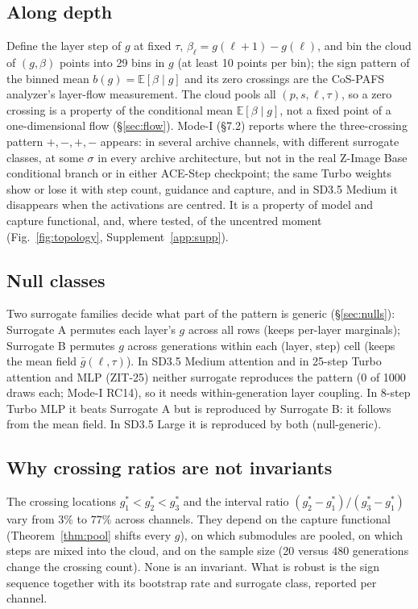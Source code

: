 \documentclass[11pt]{article}
\theoremstyle{definition}
\newcommand{\E}{\mathbb{E}}
\newcommand{\TT}{ZIT-25}%
\begin{document}
\subsection{Along depth}
Define the layer step of $g$ at fixed $\tau$, $\beta_\ell=g(\ell+1)-g(\ell)$, and bin the cloud of $(g,\beta)$ points into 29 bins in $g$ (at least 10 points per bin); the sign pattern of the binned mean $b(g)=\E[\beta\mid g]$ and its zero crossings are the CoS-PAFS analyzer's layer-flow measurement. The cloud pools all $(p,s,\ell,\tau)$, so a zero crossing is a property of the conditional mean $\E[\beta\mid g]$, not a fixed point of a one-dimensional flow (\S\ref{sec:flow}). Mode-I (\S7.2) reports where the three-crossing pattern $+,-,+,-$ appears: in several archive channels, with different surrogate classes, at some $\sigma$ in every archive architecture, but not in the real Z-Image Base conditional branch or in either ACE-Step checkpoint; the same Turbo weights show or lose it with step count, guidance and capture, and in SD3.5 Medium it disappears when the activations are centred. It is a property of model and capture functional, and, where tested, of the uncentred moment (Fig.~\ref{fig:topology}, Supplement~\ref{app:supp}).

\subsection{Null classes}
Two surrogate families decide what part of the pattern is generic (\S\ref{sec:nulls}): Surrogate A permutes each layer's $g$ across all rows (keeps per-layer marginals); Surrogate B permutes $g$ across generations within each (layer, step) cell (keeps the mean field $\bar g(\ell,\tau)$). In SD3.5 Medium attention and in 25-step Turbo attention and MLP (\TT{}) neither surrogate reproduces the pattern (0 of 1000 draws each; Mode-I RC14), so it needs within-generation layer coupling. In 8-step Turbo MLP it beats Surrogate A but is reproduced by Surrogate B: it follows from the mean field. In SD3.5 Large it is reproduced by both (null-generic).

\subsection{Why crossing ratios are not invariants}
The crossing locations $g^*_1<g^*_2<g^*_3$ and the interval ratio $(g^*_2-g^*_1)/(g^*_3-g^*_1)$ vary from $3\%$ to $77\%$ across channels. They depend on the capture functional (Theorem~\ref{thm:pool} shifts every $g$), on which submodules are pooled, on which steps are mixed into the cloud, and on the sample size (20 versus 480 generations change the crossing count). None is an invariant. What is robust is the sign sequence together with its bootstrap rate and surrogate class, reported per channel.
\end{document}
